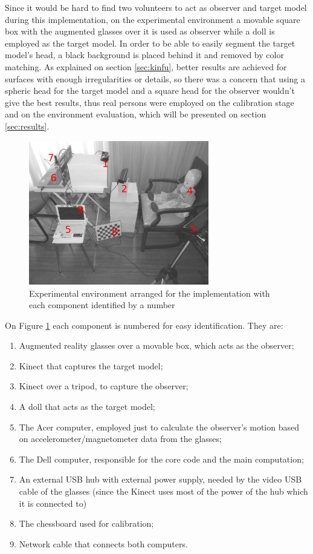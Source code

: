 \documentclass[msc, a4paper, classic, en]{ufbathesis}
\begin{document}
Since it would be hard to find two volunteers to act as observer and target model during this implementation, on the experimental environment a movable square box with the augmented glasses over it is used as observer while a doll is employed as the target model. In order to be able to easily segment the target model's head, a black background is placed behind it and removed by color matching. As explained on section \ref{sec:kinfu}, better results are achieved for surfaces with enough irregularities or details, so there was a concern that using a spheric head for the target model and a square head for the observer wouldn't give the best results, thus real persons were employed on the calibration stage and on the environment evaluation, which will be presented on section \ref{sec:results}.

\begin{figure}
\centering
\includegraphics[width=0.7\textwidth]{images/expenv2.jpg}
\caption{Experimental environment arranged for the implementation with each component identified by a number}
\label{fig:expenv2}
\end{figure}

On Figure \ref{fig:expenv2} each component is numbered for easy identification. They are:

\begin{enumerate}
  \item Augmented reality glasses over a movable box, which acts as the observer;
  \item Kinect that captures the target model;
  \item Kinect over a tripod, to capture the observer;
  \item A doll that acts as the target model;
  \item The Acer computer, employed just to calculate the observer's motion based on accelerometer/magnetometer data from the glasses;
  \item The Dell computer, responsible for the core code and the main computation;
  \item An external USB hub with external power supply, needed by the video USB cable of the glasses (since the Kinect uses most of the power of the hub which it is connected to)
  \item The chessboard used for calibration;
  \item Network cable that connects both computers.
\end{enumerate}
\end{document}
